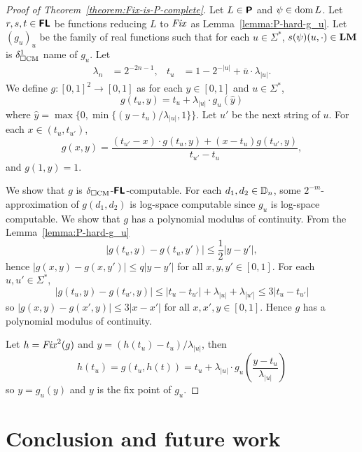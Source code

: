 \documentclass{article}
\theoremstyle{definition}
\theoremstyle{remark}
\begin{document}
\begin{proof}
[Proof of Theorem~\ref{theorem:Fix-is-P-complete}]
Let $L \in \text{\bfseries \sffamily \upshape P}$ and $\psi \in \mathop{\rm dom} L$.
Let $r, s, t \in \text{\bfseries \sffamily \upshape FL}$ be functions reducing $L$ to $\mathit{Fix}$
as Lemma~\ref{lemma:P-hard-g_u}.
Let $(g_u)_u$ be the family of real functions such that for each $u \in \Sigma^*$, 
$s(\psi)(u, \cdot) \in \mathbf{LM}$ is $\delta _{\square \mathrm{CM}}^1$ name of $g_u$.
Let
\begin{align}
 \lambda_n &= 2^{-2n-1},
 &
 t_u & = 1 - 2^{-|u|} + \bar u \cdot \lambda_{|u|}.
\end{align}
We define $g \colon [0,1]^2 \to [0,1]$ as
for each $y \in [0,1]$ and $u \in \Sigma^*$,
\begin{equation}
 g(t_u, y) = t_u + \lambda_{|u|} \cdot g_u(\hat y)
\end{equation}
where $\hat y = \max\{0, \min\{(y-t_u)/\lambda_{|u|}, 1\}\}$.
Let $u'$ be the next string of $u$.
For each $x \in (t_u, t_{u'})$,
\begin{equation}
 g(x, y) 
  = \frac{(t_{u'} - x) \cdot g(t_u, y) + (x - t_u)g(t_{u'}, y)}{t_{u'} - t_u},
\end{equation}
and $g(1, y) = 1$.

We show that $g$ is $\delta _{\square \mathrm{CM}}$-$\text{\bfseries \sffamily \upshape FL}$-computable.
For each $d_1, d_2 \in \mathbb D_n$, some $2^{-m}$-approximation of $g(d_1, d_2)$ 
is log-space computable since $g_u$ is log-space computable.
We show that $g$ has a polynomial modulus of continuity.
From the Lemma~\ref{lemma:P-hard-g_u}
\begin{equation}
 |g(t_u, y) - g(t_u, y')| \le \frac 1 2 |y - y'|,
\end{equation}
hence $|g(x, y) - g(x, y')| \le q|y - y'|$ for all $x, y, y' \in [0,1]$.
For each $u, u' \in \Sigma^*$,
\begin{equation}
 |g(t_u, y) - g(t_{u'}, y)| \le |t_u - t_{u'}| + \lambda_{|u|} + \lambda_{|u'|} \le 3|t_u - t_{u'}|
\end{equation}
so $|g(x, y) - g(x', y)| \le 3|x-x'|$ for all $x, x', y \in [0,1]$.
Hence $g$ has a polynomial modulus of continuity.


Let $h = \mathit{Fix}^2(g)$ and $y = (h(t_u)-t_u)/\lambda_{|u|}$, then
\begin{equation}
 h(t_u) = g(t_u, h(t)) = t_u + \lambda_{|u|} \cdot g_u \left( \frac{y-t_u}{\lambda_{|u|}} \right)
\end{equation}
so $y = g_u(y)$ and $y$ is the fix point of $g_u$.
\end{proof}


\section{Conclusion and future work}
\label{chapter:conclusion}
\end{document}
